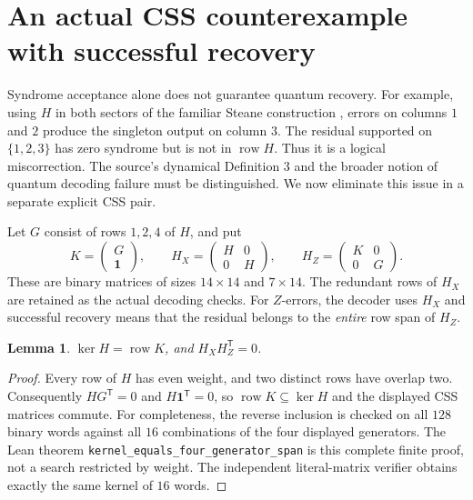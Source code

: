 \documentclass[11pt]{article}
\newtheorem{lemma}[theorem]{Lemma}
\newcommand{\row}{\operatorname{row}}
\begin{document}
\section{An actual CSS counterexample with successful recovery}\label{sec:css}
Syndrome acceptance alone does not guarantee quantum recovery. For example,
using $H$ in both sectors of the familiar Steane construction \cite{steane},
errors on columns $1$ and $2$ produce the singleton output on column $3$.
The residual supported on $\{1,2,3\}$ has zero syndrome but is not in
$\row H$. Thus it is a logical miscorrection. The source's dynamical
Definition 3 and the broader notion of quantum decoding failure must be
distinguished. We now eliminate this issue in a separate explicit CSS pair.

Let $G$ consist of rows $1,2,4$ of $H$, and put
\[
 K=\begin{pmatrix}G\\\mathbf1\end{pmatrix},\qquad
 H_X=\begin{pmatrix}H&0\\0&H\end{pmatrix},\qquad
 H_Z=\begin{pmatrix}K&0\\0&G\end{pmatrix}.
\]
These are binary matrices of sizes $14\times14$ and $7\times14$.
The redundant rows of $H_X$ are retained as the actual decoding checks.
For $Z$-errors, the decoder uses $H_X$ and successful recovery means that
the residual belongs to the \emph{entire} row span of $H_Z$.

\begin{lemma}\label{lem:kernel}
$\ker H=\row K$, and $H_XH_Z^{\mathsf T}=0$.
\end{lemma}
\begin{proof}
Every row of $H$ has even weight, and two distinct rows have overlap two.
Consequently $HG^{\mathsf T}=0$ and $H\mathbf1^{\mathsf T}=0$, so
$\row K\subseteq\ker H$ and the displayed CSS matrices commute.
For completeness, the reverse inclusion is checked on all $128$ binary
words against all $16$ combinations of the four displayed generators.
The Lean theorem \texttt{kernel\_equals\_four\_generator\_span} is this
complete finite proof, not a search restricted by weight. The independent
literal-matrix verifier obtains exactly the same kernel of $16$ words.
\end{proof}
\end{document}
